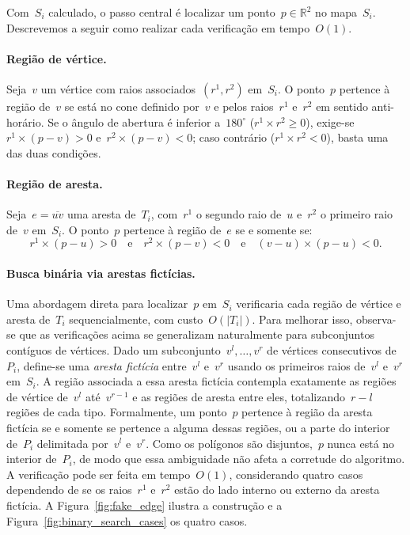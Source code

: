 \documentclass[11pt]{article}
\begin{document}
Com~\(S_i\) calculado, o passo central é localizar um ponto~\(p \in \mathbb{R}^2\) no mapa~\(S_i\). Descrevemos a seguir como realizar cada verificação em tempo~\(O(1)\).

\paragraph{Região de vértice.} Seja~\(v\) um vértice com raios associados~\((r^1, r^2)\) em~\(S_i\). O ponto~\(p\) pertence à região de~\(v\) se está no cone definido por~\(v\) e pelos raios~\(r^1\) e~\(r^2\) em sentido anti-horário. Se o ângulo de abertura é inferior a~\(180^\circ\) (\(r^1 \times r^2 \ge 0\)), exige-se~\(r^1 \times (p - v) > 0\) e~\(r^2 \times (p - v) < 0\); caso contrário (\(r^1 \times r^2 < 0\)), basta uma das duas condições.

\paragraph{Região de aresta.} Seja~\(e = \overline{uv}\) uma aresta de~\(T_i\), com~\(r^1\) o segundo raio de~\(u\) e~\(r^2\) o primeiro raio de~\(v\) em~\(S_i\). O ponto~\(p\) pertence à região de~\(e\) se e somente se:
\[
	r^1 \times (p - u) > 0 \quad \text{e} \quad r^2 \times (p - v) < 0 \quad \text{e} \quad (v - u) \times (p - u) < 0.
\]

\paragraph{Busca binária via arestas fictícias.} Uma abordagem direta para localizar~\(p\) em~\(S_i\) verificaria cada região de vértice e aresta de~\(T_i\) sequencialmente, com custo~\(O(|T_i|)\). Para melhorar isso, observa-se que as verificações acima se generalizam naturalmente para subconjuntos contíguos de vértices. Dado um subconjunto~\(v^l, \dots, v^r\) de vértices consecutivos de~\(P_i\), define-se uma \textit{aresta fictícia} entre~\(v^l\) e~\(v^r\) usando os primeiros raios de~\(v^l\) e~\(v^r\) em~\(S_i\). A região associada a essa aresta fictícia contempla exatamente as regiões de vértice de~\(v^l\) até~\(v^{r-1}\) e as regiões de aresta entre eles, totalizando~\(r - l\) regiões de cada tipo. Formalmente, um ponto~\(p\) pertence à região da aresta fictícia se e somente se pertence a alguma dessas regiões, ou a parte do interior de~\(P_i\) delimitada por~\(v^l\) e~\(v^r\). Como os polígonos são disjuntos,~\(p\) nunca está no interior de~\(P_i\), de modo que essa ambiguidade não afeta a corretude do algoritmo. A verificação pode ser feita em tempo~\(O(1)\), considerando quatro casos dependendo de se os raios~\(r^1\) e~\(r^2\) estão do lado interno ou externo da aresta fictícia. A Figura~\ref{fig:fake_edge} ilustra a construção e a Figura~\ref{fig:binary_search_cases} os quatro casos.
\end{document}
